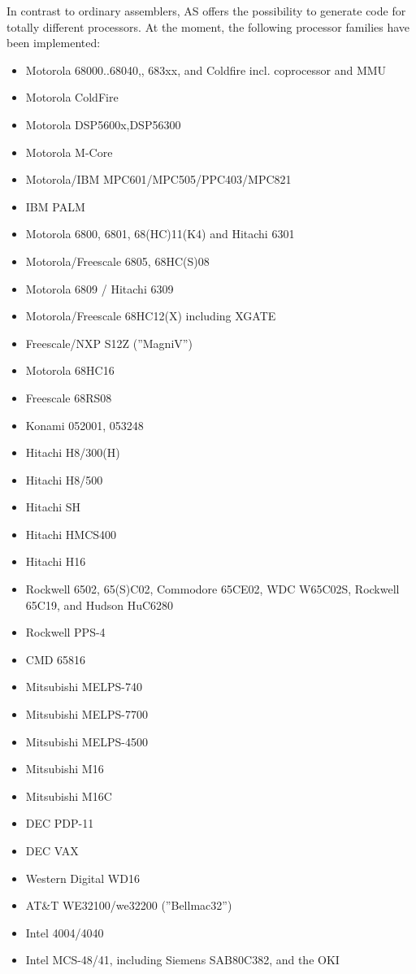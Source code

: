 \documentclass[12pt,twoside]{report}
\newcommand{\asname}{{AS}}
\begin{document}
In contrast to ordinary assemblers, \asname{} offers the possibility to
generate code for totally different processors.  At the moment, the
following processor families have been implemented:
\begin{itemize}
\item{Motorola 68000..68040,, 683xx, and Coldfire incl. coprocessor and MMU}
\item{Motorola ColdFire}
\item{Motorola DSP5600x,DSP56300}\item{Motorola M-Core}
\item{Motorola/IBM MPC601/MPC505/PPC403/MPC821}
\item{IBM PALM}
\item{Motorola 6800, 6801, 68(HC)11(K4) and Hitachi 6301}
\item{Motorola/Freescale 6805, 68HC(S)08}
\item{Motorola 6809 / Hitachi 6309}
\item{Motorola/Freescale 68HC12(X) including XGATE}
\item{Freescale/NXP S12Z (''MagniV'')}
\item{Motorola 68HC16}
\item{Freescale 68RS08}
\item{Konami 052001, 053248}
\item{Hitachi H8/300(H)}
\item{Hitachi H8/500}
\item{Hitachi SH}
\item{Hitachi HMCS400}
\item{Hitachi H16}
\item{Rockwell 6502, 65(S)C02, Commodore 65CE02, WDC W65C02S, Rockwell 65C19, and
      Hudson HuC6280}
\item{Rockwell PPS-4}
\item{CMD 65816}
\item{Mitsubishi MELPS-740}
\item{Mitsubishi MELPS-7700}
\item{Mitsubishi MELPS-4500}
\item{Mitsubishi M16}
\item{Mitsubishi M16C}
\item{DEC PDP-11}
\item{DEC VAX}
\item{Western Digital WD16}
\item{AT\&T WE32100/we32200 (''Bellmac32'')}
\item{Intel 4004/4040}
\item{Intel MCS-48/41, including Siemens SAB80C382, and the OKI
}
\end{itemize}
\end{document}

